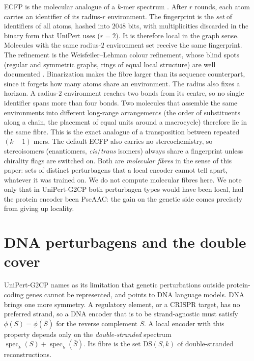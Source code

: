 \documentclass[11pt]{article}
\theoremstyle{plain}
\theoremstyle{definition}
\theoremstyle{remark}
\newcommand{\spec}{\operatorname{spec}}
\newcommand{\DS}{\mathrm{DS}}
\begin{document}
ECFP is the molecular analogue of a $k$-mer spectrum \cite{RH10}. After $r$ rounds, each atom carries
an identifier of its radius-$r$ environment. The fingerprint is the \emph{set} of identifiers of all
atoms, hashed into $2048$ bits, with multiplicities discarded in the binary form that UniPert uses
($r=2$). It is therefore local in the graph sense. Molecules with the same radius-$2$ environment
set receive the same fingerprint. The refinement is the Weisfeiler--Lehman colour refinement, whose
blind spots (regular and symmetric graphs, rings of equal local structure) are well
documented \cite{XHLJ19}. Binarization makes the fibre larger than its sequence counterpart, since it
forgets how many atoms share an environment. The radius also fixes a horizon. A radius-$2$
environment reaches two bonds from its centre, so no single identifier spans more than four bonds.
Two molecules that assemble the same environments into different long-range arrangements (the
order of substituents along a chain, the placement of equal units around a macrocycle) therefore
lie in the same fibre. This is the exact analogue of a transposition between repeated
$(k-1)$-mers. The default ECFP also carries no stereochemistry, so stereoisomers (enantiomers,
\emph{cis}/\emph{trans} isomers) always share a fingerprint unless chirality flags are switched on.
Both are \emph{molecular fibres} in the sense of this paper: sets of distinct perturbagens that a local
encoder cannot tell apart, whatever it was trained on. We do not compute molecular fibres here. We note only
that in UniPert-G2CP both perturbagen types would have been local, had the protein encoder been
PseAAC: the gain on the genetic side comes precisely from giving up locality.

\section{DNA perturbagens and the double cover}\label{sec:dna}

UniPert-G2CP names as its limitation that genetic perturbations outside protein-coding genes cannot
be represented, and points to DNA language models. DNA brings one more symmetry. A regulatory
element, or a CRISPR target, has no preferred strand, so a DNA encoder that is to be strand-agnostic
must satisfy $\phi(S)=\phi(\bar S)$ for the reverse complement $\bar S$. A local encoder with this
property depends only on the \emph{double-stranded} spectrum $\spec_k(S)+\spec_k(\bar S)$. Its fibre
is the set $\DS(S,k)$ of double-stranded reconstructions.
\end{document}
